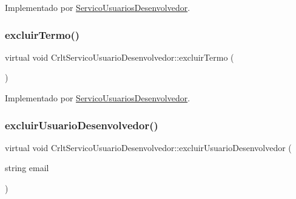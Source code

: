 Implementado por \mbox{\hyperlink{class_servico_usuarios_desenvolvedor_a422f9a3ee77a0d560858c9f7c266b9ee}{Servico\+Usuarios\+Desenvolvedor}}.

\mbox{\label{class_crlt_servico_usuario_desenvolvedor_a95825708aeed4c1f6a5829ad4bd29673}} 
\subsubsection{\texorpdfstring{excluir\+Termo()}{excluirTermo()}}
{\footnotesize\ttfamily virtual void Crlt\+Servico\+Usuario\+Desenvolvedor\+::excluir\+Termo (\begin{DoxyParamCaption}{ }\end{DoxyParamCaption})\hspace{0.3cm}{\ttfamily [pure virtual]}}



Implementado por \mbox{\hyperlink{class_servico_usuarios_desenvolvedor_a20712917886eaf28a2a9b308d14d7b04}{Servico\+Usuarios\+Desenvolvedor}}.

\mbox{\label{class_crlt_servico_usuario_desenvolvedor_aa106326b5823377bd842b7448e0b4ee3}} 
\subsubsection{\texorpdfstring{excluir\+Usuario\+Desenvolvedor()}{excluirUsuarioDesenvolvedor()}}
{\footnotesize\ttfamily virtual void Crlt\+Servico\+Usuario\+Desenvolvedor\+::excluir\+Usuario\+Desenvolvedor (\begin{DoxyParamCaption}\item[{string}]{email }\end{DoxyParamCaption})\hspace{0.3cm}{\ttfamily [pure virtual]}}



